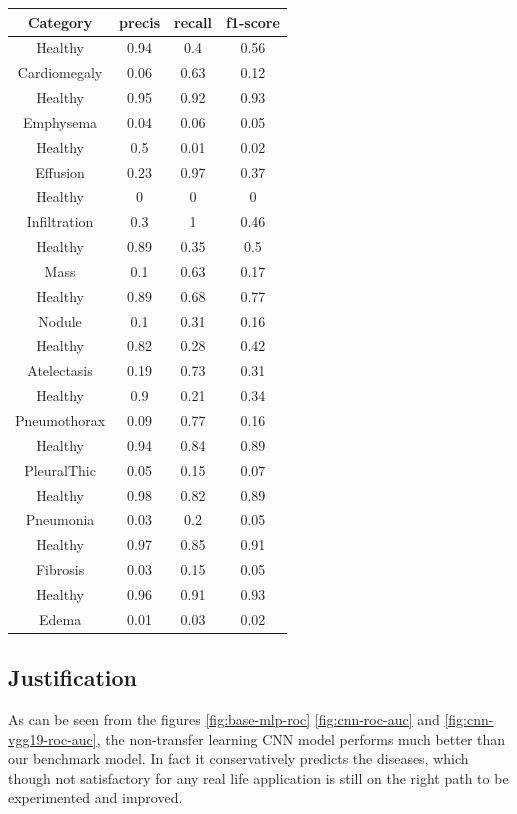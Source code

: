 \documentclass{article}
\begin{document}
    \begin{center}
        \begin{tabular}{||c c c c||}
            \hline
            Category&precis&recall&f1-score \\ 
            \hline
            Healthy&0.94&0.4&0.56 \\
            Cardiomegaly&0.06&0.63&0.12 \\ 
            \hline
            Healthy&0.95&0.92&0.93 \\
            Emphysema&0.04&0.06&0.05 \\ 
            \hline
            Healthy&0.5&0.01&0.02 \\
            Effusion&0.23&0.97&0.37 \\ 
            \hline
            Healthy&0&0&0 \\
            Infiltration&0.3&1&0.46 \\ 
            \hline
            Healthy&0.89&0.35&0.5 \\
            Mass&0.1&0.63&0.17 \\ 
            \hline
            Healthy&0.89&0.68&0.77 \\
            Nodule&0.1&0.31&0.16 \\ 
            \hline
            Healthy&0.82&0.28&0.42 \\
            Atelectasis&0.19&0.73&0.31 \\ 
            \hline
            Healthy&0.9&0.21&0.34 \\
            Pneumothorax&0.09&0.77&0.16 \\ 
            \hline
            Healthy&0.94&0.84&0.89 \\
            PleuralThic&0.05&0.15&0.07 \\ 
            \hline
            Healthy&0.98&0.82&0.89 \\
            Pneumonia&0.03&0.2&0.05 \\ 
            \hline
            Healthy&0.97&0.85&0.91 \\
            Fibrosis&0.03&0.15&0.05 \\ 
            \hline
            Healthy&0.96&0.91&0.93 \\
            Edema&0.01&0.03&0.02 \\ 
            \hline
        \end{tabular}
    \end{center}

    \subsection{Justification}
    As can be seen from the figures \ref{fig:base-mlp-roc} \ref{fig:cnn-roc-auc} and \ref{fig:cnn-vgg19-roc-auc}, the non-transfer learning CNN model performs much better than our benchmark model. In fact it conservatively predicts the diseases, which though not satisfactory for any real life application is still on the right path to be experimented and improved. 
\end{document}

